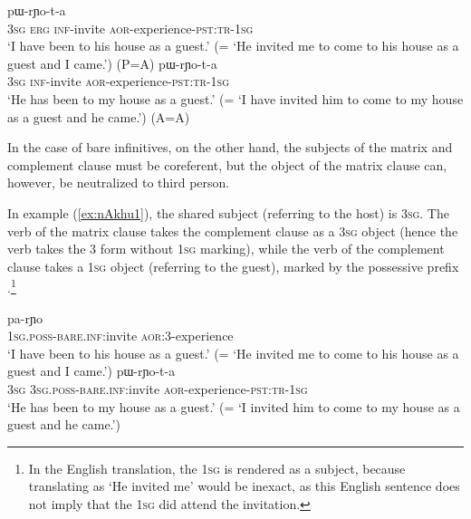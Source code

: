\begin{exe}
\ex  \label{ex:kAnAkhu1}
 pɯ-rɲo-t-a  \\
\textsc{3sg} \textsc{erg} \textsc{inf}-invite \textsc{aor}-experience-\textsc{pst}:\textsc{tr}-\textsc{1sg} \\
\glt `I have been to his house as a guest.'  (= `He invited me to come to his house as a guest and I came.') (P=A)
\ex  \label{ex:kAnAkhu2}
 pɯ-rɲo-t-a  \\
\textsc{3sg}  \textsc{inf}-invite \textsc{aor}-experience-\textsc{pst}:\textsc{tr}-\textsc{1sg} \\
\glt `He has been to my house as a guest.' (= `I have invited him to come to my house as a guest and he came.') (A=A)
\end{exe}

In the case of bare infinitives, on the other hand, the subjects of the matrix and complement clause must be coreferent, but the object of the matrix clause can, however, be neutralized to third person.

In example (\ref{ex:nAkhu1}), the shared subject (referring to the host) is \textsc{3sg}. The verb of the matrix clause takes the complement clause as a \textsc{3sg} object (hence the verb takes the 3\flobv{} form without \textsc{1sg} marking), while the verb of the complement clause takes a \textsc{1sg} object (referring to the guest), marked by the possessive prefix .\footnote{In the English translation, the \textsc{1sg} is rendered as a subject, because translating   as `He invited me' would be inexact, as this English sentence does not imply that the \textsc{1sg} did attend the invitation. }

\begin{exe}
\ex  \label{ex:nAkhu1}
\gll [a-nɤkʰu] pa-rɲo \\
\textsc{1sg}.\textsc{poss}-\textsc{bare}.\textsc{inf:}invite \textsc{aor}:3\flobv{}-experience \\
\glt `I have been to his house as a guest.' (= `He invited me to come to his house as a guest and I came.')
\ex  \label{ex:nAkhu2}
 pɯ-rɲo-t-a  \\
\textsc{3sg}  \textsc{3sg}.\textsc{poss}-\textsc{bare}.\textsc{inf}:invite \textsc{aor}-experience-\textsc{pst}:\textsc{tr}-\textsc{1sg} \\
\glt `He has been to my house as a guest.' (= `I invited him to come to my house as a guest and he came.')
\end{exe}

